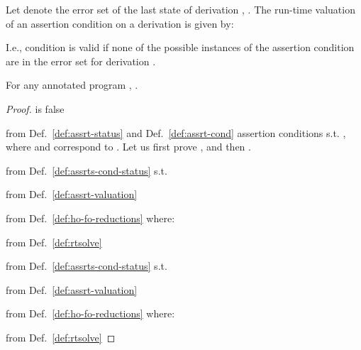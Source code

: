 \documentclass{llncs}
\begin{document}
\begin{definition}
  \label{def:rtsolve}
Let  denote the error set of the last state
  of derivation 
  , .
The run-time valuation of an assertion condition  on a derivation
   is given by:

\end{definition}
I.e., condition  is valid if none of the possible
instances of the assertion condition  are in the error set for
derivation .

\begin{theorem}
  \label{thm:rtcheck}
  For any annotated program , 
     .
\end{theorem}

\begin{proof}
   is false
\newline
  
  from Def.~\ref{def:assrt-status} and Def.~\ref{def:assrt-cond}
   assertion conditions s.t. 
  , where
   and
   correspond to . Let us first
  prove , and then 
  . 

\hfill\newline
  
\newline
  
  from Def.~\ref{def:assrts-cond-status} 
   s.t. 
  
\newline
  
  from Def.~\ref{def:assrt-valuation}
   
  
\newline
  
  from Def.~\ref{def:ho-fo-reductions} 
   where:

  
  from Def.~\ref{def:rtsolve} 
  
\hfill 

\hfill\newline
  
\newline
  
  from Def.~\ref{def:assrts-cond-status} 
   s.t. 
  
\newline
  
  from Def.~\ref{def:assrt-valuation}
   
   
  
\newline
  
  from Def.~\ref{def:ho-fo-reductions} 
    where:

  
  from Def.~\ref{def:rtsolve} 
  
\hfill 
\end{proof}
\end{document}
